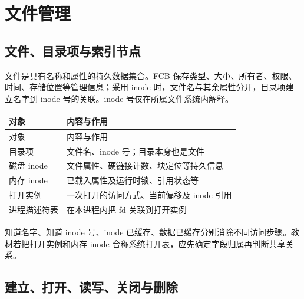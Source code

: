 \chapter{文件管理}\label{OS04}

\section{文件、目录项与索引节点}\label{OS04-objects}

文件是具有名称和属性的持久数据集合。FCB 保存类型、大小、所有者、权限、时间、存储位置等管理信息；采用 inode 时，文件名与其余属性分开，目录项建立名字到 inode 号的关联。inode 号仅在所属文件系统内解释。

\par\smallskip
{\fontsize{9.3}{12}\selectfont\setlength{\tabcolsep}{2.5pt}\setlength{\LTleft}{0pt}\setlength{\LTright}{0pt}
\begin{longtable}{@{}>{\raggedright\arraybackslash}p{}>{\raggedright\arraybackslash}p{}@{}}
\toprule
对象 & 内容与作用 \\

\midrule\endfirsthead\toprule
对象 & 内容与作用 \\

\midrule\endhead\bottomrule\endfoot
目录项 & 文件名、inode 号；目录本身也是文件 \\

磁盘 inode & 文件属性、硬链接计数、块定位等持久信息 \\

内存 inode & 已载入属性及运行时锁、引用状态等 \\

打开实例 & 一次打开的访问方式、当前偏移及 inode 引用 \\

进程描述符表 & 在本进程内把 fd 关联到打开实例 \\

\end{longtable}}
\par\smallskip

知道名字、知道 inode 号、inode 已缓存、数据已缓存分别消除不同访问步骤。教材若把打开实例和内存 inode 合称系统打开表，应先确定字段归属再判断共享关系。

\section{建立、打开、读写、关闭与删除}\label{OS04-operations}

